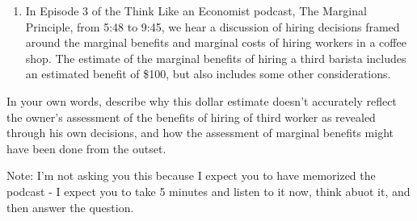 \documentclass[11pt,]{article}
\providecommand{\tightlist}{%
  \setlength{\itemsep}{0pt}\setlength{\parskip}{0pt}}
\begin{document}
\newpage

\begin{enumerate}
\def\labelenumi{\arabic{enumi}.}
\setcounter{enumi}{3}
\tightlist
\item
  In Episode 3 of the Think Like an Economist podcast, The Marginal
  Principle, from 5:48 to 9:45, we hear a discussion of hiring decisions
  framed around the marginal benefits and marginal costs of hiring
  workers in a coffee shop. The estimate of the marginal benefits of
  hiring a third barista includes an estimated benefit of \$100, but
  also includes some other considerations.
\end{enumerate}

In your own words, describe why this dollar estimate doesn't accurately
reflect the owner's assessment of the benefits of hiring of third worker
as revealed through his own decisions, and how the assessment of
marginal benefits might have been done from the outset.

Note: I'm not asking you this because I expect you to have memorized the
podcast - I expect you to take 5 minutes and listen to it now, think
abuot it, and then answer the question.
\end{document}
